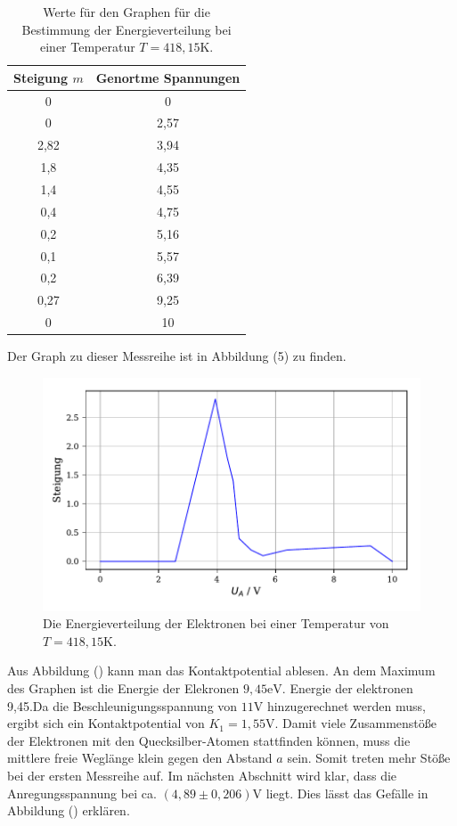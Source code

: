 \begin{table}[H]
  \centering
  \caption{Werte für den Graphen für die Bestimmung der Energieverteilung bei einer Temperatur $T=418,15$K.}
  \label{tab:Parameter}
  \begin{tabular}{c c}
    \toprule
    Steigung $m$ &  Genortme Spannungen \\
    \bottomrule
    0 & 0\\
    0 & 2,57\\
    2,82 & 3,94\\
    1,8 &4,35\\
    1,4 &4,55\\
    0,4 &4,75\\
    0,2 &5,16\\
    0,1 &5,57\\
    0,2&6,39\\
    0,27 &9,25\\
    0 &10\\
  
    \bottomrule
  \end{tabular}
\end{table}

Der Graph zu dieser Messreihe ist in Abbildung (5) zu finden.

\begin{figure}[H]
  \centering
  \includegraphics{plota2.pdf}
  \caption{Die Energieverteilung der Elektronen bei einer Temperatur von $T=418,15$K.}
  \label{fig:plot}
\end{figure}

\noindent Aus Abbildung () kann man das Kontaktpotential ablesen. 
An dem Maximum des Graphen ist die Energie der Elekronen $9,45\si{\eV}$.
Energie der elektronen 9,45.Da die Beschleunigungsspannung von $11\si{\V}$ hinzugerechnet werden muss, ergibt sich
ein Kontaktpotential von $K_1 = 1,55 \si{\V}$.
Damit viele Zusammenstöße der Elektronen mit den Quecksilber-Atomen stattfinden können, muss die mittlere freie Weglänge klein gegen den Abstand $a$ sein.
Somit treten mehr Stöße bei der ersten Messreihe auf.
Im nächsten Abschnitt wird klar, dass die Anregungsspannung bei ca. $ (4,89 \pm 0,206) \si{\V}$ liegt. Dies lässt das Gefälle in Abbildung () erklären.

